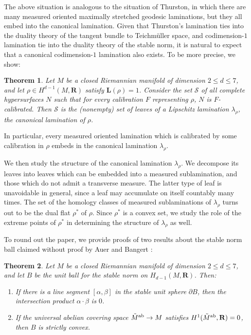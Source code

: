 \documentclass[reqno,11pt]{amsart}
\newcommand{\RR}{\mathbf{R}}
\newcommand{\Comass}{\mathbf L}
\newcommand{\dfn}[1]{\emph{#1}\index{#1}}
\newtheorem{mainthm}{Theorem}
\theoremstyle{definition}
\numberwithin{equation}{section}
\begin{document}
The above situation is analogous to the situation of Thurston, in which there are many measured oriented maximally stretched geodesic laminations, but they all embed into the canonical lamination.
Given that Thurston's lamination ties into the duality theory of the tangent bundle to Teichm\"uller space, and codimension-$1$ lamination tie into the duality theory of the stable norm, it is natural to expect that a canonical codimension-$1$ lamination also exists.
To be more precise, we show:

\begin{mainthm}\label{existence of calibrated lam}
Let $M$ be a closed Riemannian manifold of dimension $2 \leq d \leq 7$, and let $\rho \in H^{d - 1}(M, \RR)$ satisfy $\Comass(\rho) = 1$.
Consider the set $\mathscr S$ of all complete hypersurfaces $N$ such that for every calibration $F$ representing $\rho$, $N$ is $F$-calibrated.
Then $\mathscr S$ is the (nonempty) set of leaves of a Lipschitz lamination $\lambda_\rho$, the \dfn{canonical lamination} of $\rho$.
\end{mainthm}

In particular, every measured oriented lamination which is calibrated by some calibration in $\rho$ embeds in the canonical lamination $\lambda_\rho$.

We then study the structure of the canonical lamination $\lambda_\rho$.
We decompose its leaves into leaves which can be embedded into a measured sublamination, and those which do not admit a transverse measure.
The latter type of leaf is unavoidable in general, since a leaf may accumulate on itself countably many times.
The set of the homology classes of measured sublaminations of $\lambda_\rho$ turns out to be the dual flat $\rho^*$ of $\rho$.
Since $\rho^*$ is a convex set, we study the role of the extreme points of $\rho^*$ in determining the structure of $\lambda_\rho$ as well.

To round out the paper, we provide proofs of two results about the stable norm ball claimed without proof by Auer and Bangert \cite[Theorems 6 and 7]{Auer01}:

\begin{mainthm}
Let $M$ be a closed Riemannian manifold of dimension $2 \leq d \leq 7$, and let $B$ be the unit ball for the stable norm on $H_{d - 1}(M, \RR)$.
Then:
\begin{enumerate}
\item If there is a line segment $[\alpha, \beta]$ in the stable unit sphere $\partial B$, then the intersection product $\alpha \cdot \beta$ is $0$.
\item If the universal abelian covering space $\tilde M^{\rm ab} \to M$ satisfies $H^1(\tilde M^{\rm ab}, \RR) = 0$, then $B$ is strictly convex.
\end{enumerate}
\end{mainthm}
\end{document}

